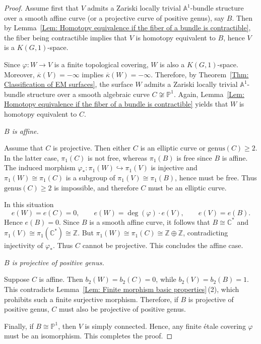 \documentclass[12pt,reqno,twoside]{amsart}
\theoremstyle{definition}
\numberwithin{equation}{section}
\newcommand{\A}{\mathbb{A}}
\newcommand{\C}{\mathbb{C}}
\newcommand{\Z}{\mathbb{Z}}
\newcommand{\PP}{\mathbb{P}}
\begin{document}
\begin{proof}
Assume first that $V$ admits a Zariski locally trivial $\A^{1}$-bundle structure over a smooth affine curve (or a projective curve of positive genus), say $B$. Then by Lemma~\ref{Lem: Homotopy equivalence if the fiber of a bundle is contractible}, the fiber being contractible implies that $V$ is homotopy equivalent to $B$, hence $V$ is a $K(G,1)$-space.

Since $\varphi : W \to V$ is a finite topological covering, $W$ is also a $K(G,1)$-space. Moreover, $\overline{\kappa}(V) = -\infty$ implies $\overline{\kappa}(W) = -\infty$. Therefore, by Theorem~\ref{Thm: Classification of EM surfaces}, the surface $W$ admits a Zariski locally trivial $\A^{1}$-bundle structure over a smooth algebraic curve $C\not\cong \PP^1$. Again, Lemma~\ref{Lem: Homotopy equivalence if the fiber of a bundle is contractible} yields that $W$ is homotopy equivalent to $C$.

\medskip
{} \emph{$B$ is affine.}

\medskip
Assume that $C$ is projective. Then either $C$ is an elliptic curve or $\mathrm{genus}(C)\geq 2$. In the latter case, $\pi_1(C)$ is not free, whereas $\pi_1(B)$ is free since $B$ is affine. The induced morphism $\varphi_\ast : \pi_1(W)\hookrightarrow \pi_1(V)$ is injective and $\pi_1(W)\cong \pi_1(C)$ is a subgroup of $\pi_1(V)\cong \pi_1(B)$, hence must be free. Thus $\mathrm{genus}(C)\geq 2$ is impossible, and therefore $C$ must be an elliptic curve.

In this situation
\[
e(W)=e(C)=0,\qquad 
e(W)=\deg(\varphi)\cdot e(V), \qquad
e(V)=e(B).
\]
Hence $e(B)=0$. Since $B$ is a smooth affine curve, it follows that $B\cong \C^\ast$ and $\pi_1(V)\cong \pi_1(\C^\ast)\cong \Z$. But $\pi_1(W)\cong \pi_1(C)\cong \Z\oplus\Z$, contradicting injectivity of $\varphi_\ast$. Thus $C$ cannot be projective. This concludes the affine case.

\medskip
{} \emph{$B$ is projective of positive genus.}

\medskip
Suppose $C$ is affine. Then $b_2(W)=b_2(C)=0$, while $b_2(V)=b_2(B)=1$. This contradicts Lemma~\ref{Lem: Finite morphism basic properties}\,(2), which prohibits such a finite surjective morphism. Therefore, if $B$ is projective of positive genus, $C$ must also be projective of positive genus.

\medskip
Finally, if $B\cong \PP^1$, then $V$ is simply connected. Hence, any finite \'etale covering $\varphi$ must be an isomorphism. This completes the proof.
\end{proof}
\end{document}
